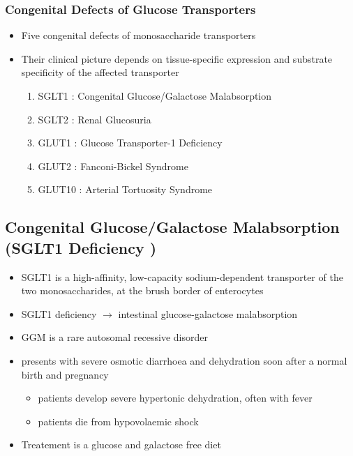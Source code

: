 \documentclass{scrartcl}
\begin{document}
\subsubsection{Congenital Defects of Glucose Transporters}
\label{sec:org62cb01d}
\begin{itemize}
\item Five congenital defects of monosaccharide transporters
\item Their clinical picture depends on tissue-specific expression and
substrate specificity of the affected transporter

\begin{enumerate}
\item SGLT1 : Congenital Glucose/Galactose Malabsorption
\item SGLT2 : Renal Glucosuria
\item GLUT1 : Glucose Transporter-1 Deficiency
\item GLUT2 : Fanconi-Bickel Syndrome
\item GLUT10 : Arterial Tortuosity Syndrome
\end{enumerate}
\end{itemize}

\subsection{Congenital Glucose/Galactose Malabsorption (SGLT1 Deficiency )}
\label{sec:orgf995cb4}

\begin{itemize}
\item SGLT1 is a high-affinity, low-capacity sodium-dependent transporter
of the two monosaccharides, at the brush border of enterocytes

\item SGLT1 deficiency \(\to\) intestinal glucose-galactose malabsorption
\item GGM is a rare autosomal recessive disorder

\item presents with severe osmotic diarrhoea and dehydration soon after a
normal birth and pregnancy
\begin{itemize}
\item patients develop severe hypertonic dehydration, often with fever
\item patients die from hypovolaemic shock
\end{itemize}

\item Treatement is a glucose and galactose free diet
\end{itemize}
\end{document}
